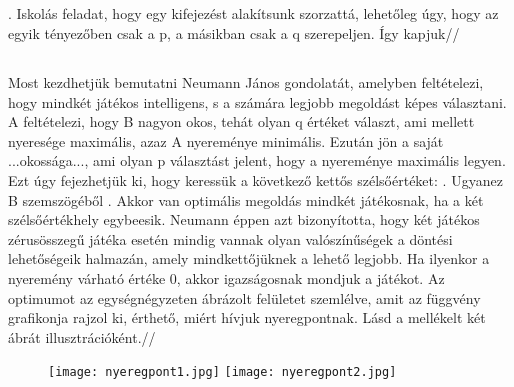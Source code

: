 \documentclass  {article}
\begin{document}
\subsection{}                     .
Iskolás feladat, hogy egy kifejezést alakítsunk szorzattá, lehetőleg úgy, hogy az egyik tényezőben csak a p, a másikban csak a q szerepeljen. Így kapjuk//
\subsection{}                   
Most kezdhetjük bemutatni Neumann János gondolatát, amelyben feltételezi, hogy mindkét játékos intelligens, s a számára legjobb megoldást képes választani. A feltételezi, hogy B nagyon okos, tehát olyan q értéket választ, ami mellett nyeresége maximális, azaz A nyereménye minimális. Ezután jön a saját ...okossága..., ami olyan p választást jelent, hogy a nyereménye maximális legyen. Ezt úgy fejezhetjük ki, hogy keressük a következő kettős szélsőértéket:  . Ugyanez B szemszögéből  . Akkor van optimális megoldás mindkét játékosnak, ha a két szélsőértékhely egybeesik. Neumann éppen azt bizonyította, hogy két játékos zérusösszegű játéka esetén mindig vannak olyan valószínűségek a döntési lehetőségeik halmazán, amely mindkettőjüknek a lehető legjobb. Ha ilyenkor a nyeremény várható értéke 0, akkor igazságosnak mondjuk a játékot. Az optimumot az egységnégyzeten ábrázolt felületet szemlélve, amit az   függvény grafikonja rajzol ki, érthető, miért hívjuk nyeregpontnak.   Lásd a mellékelt két ábrát illusztrációként.//

\begin{figure}
\begin{center}
\texttt{[image: nyeregpont1.jpg]}
\texttt{[image: nyeregpont2.jpg]}
\end{center}
\end{figure}
\end{document}
